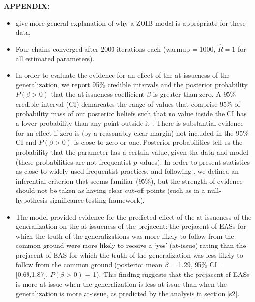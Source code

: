 \documentclass[11pt,fleqn]{article}
\newcommand{\6}{\mbox{$[\hspace*{-.6mm}[$}}
\newcommand{\9}{\mbox{$]\hspace*{-.6mm}]$}}
\begin{document}
{\bf APPENDIX:} 

\begin{itemize}

\item give more general explanation of why a ZOIB model is appropriate for these data, 

\item Four chains converged after 2000 iterations each (warmup = 1000, \(\hat{R}=1\) for all estimated parameters).

\item In order to evaluate the evidence for an effect of the at-issueness of the generalization, we report 95\% credible intervals and the posterior probability $P(\beta > 0)$ that the at-issueness coefficient $\beta$ is greater than zero. A 95\% credible interval (CI) demarcates the range of values that comprise 95\% of probability mass of our posterior beliefs such that no value inside the CI has a lower probability than any point outside it \citep{Jaynes1976, Morey2016}. There is substantial evidence for an effect if zero is (by a reasonably clear margin) not included in the 95\% CI and $P(\beta > 0)$ is close to zero or one. Posterior probabilities tell us the probability that the parameter has a certain value, given the data and model (these probabilities are not frequentist $p$-values). In order to present statistics as close to widely used frequentist practices, and following \citealt{Nicenboim2016}, we defined an inferential criterion that seems familiar (95\%), but the strength of evidence should not be taken as having clear cut-off points (such as in a null-hypothesis significance testing framework).

\item The model provided evidence for the predicted effect of the at-issueness of the generalization on the at-issueness of the prejacent: the prejacent of EASs for which the truth of the generalizations was more likely to follow from the common ground were more likely to receive a `yes' (at-issue) rating than the prejacent of EAS for which the truth of the generalization was less likely to follow from the common ground  (posterior mean $\beta$ = 1.29, 95\% CI={[}0.69,1.87{]}, $P(\beta > 0)$ = 1). This finding suggests that the prejacent of EASs is more at-issue when the generalization is less at-issue than when the generalization is more at-issue, as predicted by the analysis in section \ref{s2}.

\end{itemize}
\end{document}
